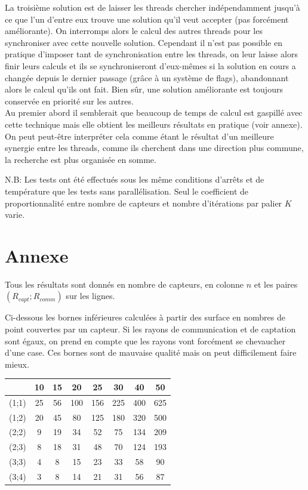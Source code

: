 \documentclass[12pt,a4paper]{article}
\begin{document}
La troisième solution est de laisser les threads chercher indépendamment jusqu'à ce que l'un d'entre eux trouve une solution qu'il veut accepter (pas forcément améliorante). On interromps alors le calcul des autres threads pour les synchroniser avec cette nouvelle solution. Cependant il n'est pas possible en pratique d'imposer tant de synchronisation entre les threads, on leur laisse alors finir leurs calculs et ils se synchroniseront d'eux-mêmes si la solution en cours a changée depuis le dernier passage (grâce à un système de flags), abandonnant alors le calcul qu'ils ont fait. Bien sûr, une solution améliorante est toujours conservée en priorité sur les autres.
\\Au premier abord il semblerait que beaucoup de temps de calcul est gaspillé avec cette technique mais elle obtient les meilleurs résultats en pratique (voir annexe). On peut peut-être interpréter cela comme étant le  résultat d'un meilleure synergie entre les threads, comme ils cherchent dans une direction plus commune, la recherche est plus organisée en somme.

N.B: Les tests ont été effectués sous les même conditions d'arrêts et de température que les tests sans parallélisation. Seul le coefficient de proportionnalité entre nombre de capteurs et nombre d'itérations par palier $K$ varie. 
\part{Annexe}
Tous les résultats sont donnés en nombre de capteurs, en colonne $n$ et les paires $(R_{capt};R_{comm})$ sur les lignes.

Ci-dessous les bornes inférieures calculées à partir des surface en nombres de point couvertes par un capteur. Si les rayons de communication et de captation sont égaux, on prend en compte que les rayons vont forcément se chevaucher d'une case. Ces bornes sont de mauvaise qualité mais on peut difficilement faire mieux.

\begin{center}
\begin{tabular}{|c|c|c|c|c|c|c|c|}
\hline
&10 & 15 & 20 & 25 & 30 & 40 & 50\\
\hline 
(1;1) & 25 & 56 & 100 & 156 & 225 & 400 & 625 \\ 
\hline 
(1;2) & 20 & 45 & 80 & 125 & 180 & 320 & 500 \\ 
\hline 
(2;2) & 9 & 19 & 34 & 52 & 75 & 134 & 209 \\ 
\hline 
(2;3) & 8 & 18 & 31 & 48 & 70 & 124 & 193 \\ 
\hline 
(3;3) & 4 & 8 & 15 & 23 & 33 & 58 & 90 \\ 
\hline 
(3;4) & 3 & 8 & 14 & 21 & 31 & 56 & 87 \\ 
\hline 
\end{tabular} 
\end{center}
\end{document}
